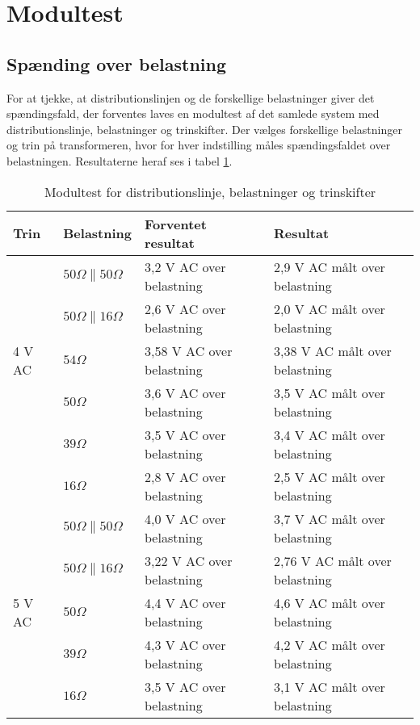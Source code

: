 

\section{Modultest}
\subsection{Spænding over belastning}
For at tjekke, at distributionslinjen og de forskellige belastninger giver det spændingsfald, der forventes laves en modultest af det samlede system med distributionslinje, belastninger og trinskifter. Der vælges forskellige belastninger og trin på transformeren, hvor for hver indstilling måles spændingsfaldet over belastningen. Resultaterne heraf ses i tabel \ref{tab:Modultesttrin}. 


\begin{table}[H]
	\centering
	\begin{tabular}{|l|l|l|l|}
		\hline
		\textbf{Trin} & \textbf{Belastning} & \textbf{Forventet resultat} & \textbf{Resultat} \\\hline
		
		\multirow{5}{*}{4 V AC} 
		& $50 \Omega\parallel 50 \Omega$ & 3,2 V AC over belastning & 2,9 V AC målt over belastning \\\hhline{~---} 	
		& $50 \Omega\parallel 16 \Omega$ & 2,6 V AC over belastning & 2,0 V AC målt over belastning \\\hhline{~---}
		& $54 \Omega$ & 3,58 V AC over belastning & 3,38 V AC målt over belastning \\\hhline{~---} 
		& $50 \Omega$ & 3,6 V AC over belastning & 3,5 V AC målt over belastning \\\hhline{~---} 	
		& $39 \Omega$ & 3,5 V AC over belastning & 3,4 V AC målt over belastning \\\hhline{~---} 
		& $16 \Omega$ & 2,8 V AC over belastning & 2,5 V AC målt over belastning \\\hline 
	
		
		\multirow{5}{*}{5 V AC} 
		& $50 \Omega\parallel 50 \Omega$ & 4,0 V AC over belastning & 3,7 V AC målt over belastning \\\hhline{~---} 	
		& $50 \Omega\parallel 16 \Omega$ & 3,22 V AC over belastning & 2,76 V AC målt over belastning \\\hhline{~---} 
		& $50 \Omega$ & 4,4 V AC over belastning & 4,6 V AC målt over belastning \\\hhline{~---} 	
		& $39 \Omega$ & 4,3 V AC over belastning & 4,2 V AC målt over belastning \\\hhline{~---} 
		& $16 \Omega$ & 3,5 V AC over belastning & 3,1 V AC målt over belastning \\\hline
		
	\end{tabular}
	\caption{Modultest for distributionslinje, belastninger og trinskifter}
	\label{tab:Modultesttrin}
\end{table}

